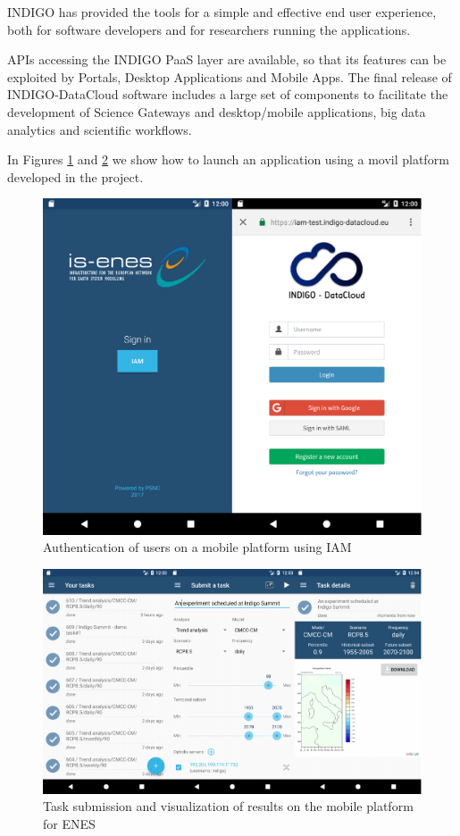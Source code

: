 \documentclass{article}
\begin{document}
INDIGO has provided the tools for a simple and effective end user experience, both for software developers and for researchers running the applications. 

APIs accessing the INDIGO PaaS layer are available, so that its features can be exploited by Portals, Desktop Applications and Mobile Apps. The final release of INDIGO-DataCloud software includes a large set of components to facilitate the development of Science Gateways and desktop/mobile applications, big data analytics and scientific workflows. 

In Figures \ref{fig:17} and \ref{fig:18} we show how to launch an application using a movil platform developed in the project. 


\begin{figure}
  \centering
  \includegraphics[width=\textwidth]{./figs/Figure17.pdf}
  \caption{Authentication of users on a mobile platform using IAM}
  \label{fig:17}
\end{figure}


\begin{figure}
  \centering
  \includegraphics[width=\textwidth]{./figs/Figure18.pdf}
  \caption{Task submission and visualization of results on the mobile platform for ENES}
  \label{fig:18}
\end{figure}
\end{document}
